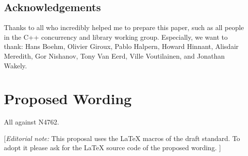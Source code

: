 \subsection*{Acknowledgements}

Thanks to all who incredibly helped me to prepare this paper, such as all people in the C++ concurrency and library working group.
Especially, we want to thank:
 Hans Boehm, Olivier Giroux, Pablo Halpern, Howard Hinnant, Alisdair Meredith, Gor Nishanov,
 Tony Van Eerd, Ville Voutilainen, and Jonathan Wakely.

\section*{Proposed Wording}
All against N4762.

{\color{blue}
[{\itshape{}Editorial note:} This proposal uses the LaTeX macros of the draft standard.
        To adopt it please ask for the LaTeX source code of the proposed wording. ]
}


